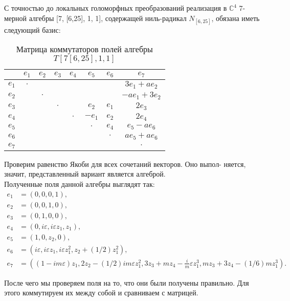 \documentclass[12pt]{article}
\begin{document}
С точностью до локальных голоморфных преобразований реализация в $\mathbb{C}^4$ 7-мерной алгебры [7, [6,25], 1, 1], содержащей ниль-радикал $N_{[6,25]}$, обязана иметь следующий базис:

\begin{table}[h!]
    \centering
    \renewcommand{\arraystretch}{1.5}
    \setlength{\arrayrulewidth}{0.3mm}
    \begin{tabular}{|c|c|c|c|c|c|c|c|}
        \hline
    & $e_1$ & $e_2$ & $e_3$ & $e_4$ & $e_5$ & $e_6$ & $e_7$ \\
        \hline
        $e_1$ & $\cdot$ & & & & & & $3e_1 + ae_2$\\
        \hline
        $e_2$ & & $\cdot$ & & & & & $-ae_1+3e_2$\\
        \hline
        $e_3$ & & & $\cdot$ & & $e_2$ & $e_1$ & $2e_3$\\
        \hline
        $e_4$ & & & & $\cdot$ & $-e_1$ & $e_2$ & $2e_4$ \\
        \hline
        $e_5$ & & & & & $\cdot$ & $e_4$ & $e_5-ae_6$ \\
        \hline
        $e_6$ & & & & & & $\cdot$ & $ae_5+ae_6$ \\
        \hline
        $e_7$ & & & & & & & $\cdot$ \\
        \hline
    \end{tabular}
    \caption{Матрица коммутаторов полей алгебры $T [7[6,25],1,1]$}
\end{table}

Проверим равенство Якоби для всех сочетаний векторов. Оно выпол-
няется, значит, представленный вариант является алгеброй.\\

Полученные поля данной алгебры выглядят так:
\begin{align*}
e_1 &= (0,0,0,1), \\
e_2 &= (0,0,1,0), \\
e_3 &= (0,1,0,0),\\
e_4 &= (0, i \varepsilon, i \varepsilon z_1, z_1), \\
e_5 &= (1, 0, z_2, 0), \\
e_6 &= (i \varepsilon, i \varepsilon z_1, i \varepsilon z_1^2, z_2 + (1/2)z_1^2), \\
e_7 &= ((1 - i m \varepsilon) z_1, 2 z_2 - (1/2) i m \varepsilon z_1^2, 3 z_3 + m z_4 - \frac{i}{m} \varepsilon z_1^3, m z_3 + 3 z_4 - (1/6) m z_1^3). 
\end{align*} 

После чего мы проверяем поля на то, что они были получены правильно. Для этого коммутируем их между собой и сравниваем с матрицей. \\
\end{document}
